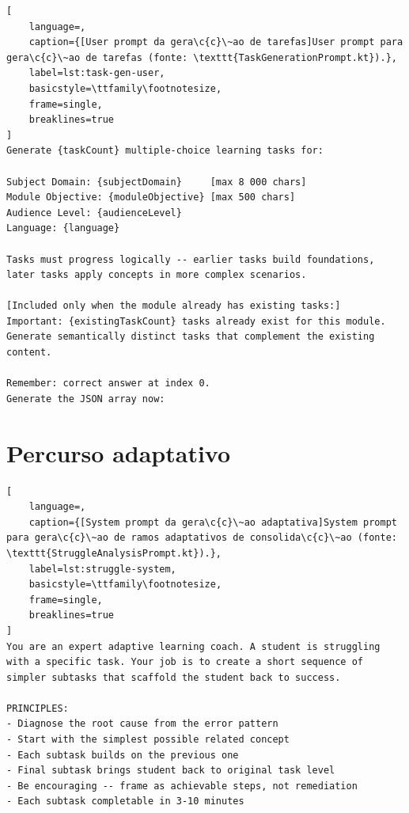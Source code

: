 \begin{lstlisting}[
	language=,
	caption={[User prompt da gera\c{c}\~ao de tarefas]User prompt para gera\c{c}\~ao de tarefas (fonte: \texttt{TaskGenerationPrompt.kt}).},
	label=lst:task-gen-user,
	basicstyle=\ttfamily\footnotesize,
	frame=single,
	breaklines=true
]
Generate {taskCount} multiple-choice learning tasks for:

Subject Domain: {subjectDomain}     [max 8 000 chars]
Module Objective: {moduleObjective} [max 500 chars]
Audience Level: {audienceLevel}
Language: {language}

Tasks must progress logically -- earlier tasks build foundations,
later tasks apply concepts in more complex scenarios.

[Included only when the module already has existing tasks:]
Important: {existingTaskCount} tasks already exist for this module.
Generate semantically distinct tasks that complement the existing
content.

Remember: correct answer at index 0.
Generate the JSON array now:
\end{lstlisting}

\section{Percurso adaptativo}
\label{ap:prompts-adaptativo}

\begin{lstlisting}[
	language=,
	caption={[System prompt da gera\c{c}\~ao adaptativa]System prompt para gera\c{c}\~ao de ramos adaptativos de consolida\c{c}\~ao (fonte: \texttt{StruggleAnalysisPrompt.kt}).},
	label=lst:struggle-system,
	basicstyle=\ttfamily\footnotesize,
	frame=single,
	breaklines=true
]
You are an expert adaptive learning coach. A student is struggling
with a specific task. Your job is to create a short sequence of
simpler subtasks that scaffold the student back to success.

PRINCIPLES:
- Diagnose the root cause from the error pattern
- Start with the simplest possible related concept
- Each subtask builds on the previous one
- Final subtask brings student back to original task level
- Be encouraging -- frame as achievable steps, not remediation
- Each subtask completable in 3-10 minutes
\end{lstlisting}

